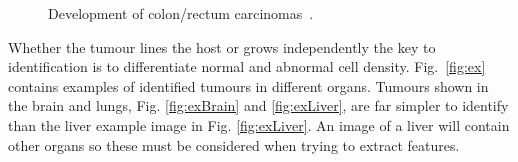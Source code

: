\documentclass[journal]{IEEEtran}
\begin{document}
\begin{figure}[!htb]
	\centering
\caption{Development of colon/rectum carcinomas~\cite{cooper1992cancer}.}
\label{fig:growing}
\end{figure}





Whether the tumour lines the host or grows independently the key to identification is to differentiate normal and abnormal cell density. 
Fig.~\ref{fig:ex} contains examples of identified tumours in different organs.
Tumours shown in the brain and lungs, Fig. \ref{fig:exBrain} and \ref{fig:exLiver}, are far simpler to identify than the liver example image in Fig. \ref{fig:exLiver}.
An image of a liver will contain other organs so these must be considered when trying to extract features.
\end{document}
